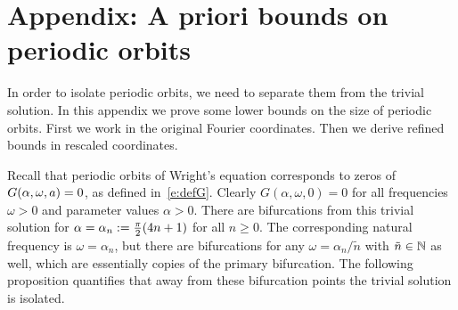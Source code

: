 

\section{Appendix: A priori bounds on periodic orbits}
\label{appendix:aprioribounds}

In order to isolate periodic orbits, we need to separate them from the trivial solution. In this appendix we prove some lower bounds on the size of periodic orbits. First we work in the original Fourier coordinates. Then we derive refined bounds in rescaled coordinates.

Recall that periodic orbits of Wright's equation corresponds to  zeros of 
$G(\alpha,\omega,a)=0$, as defined in~\eqref{e:defG}. Clearly $G(\alpha,\omega,0)=0$ for all frequencies $\omega>0$ and parameter values $\alpha>0$. There are bifurcations from this trivial solution for $\alpha=\alpha_n:=\tfrac{\pi}{2}(4n+1)$ for all $n\geq 0$. The corresponding natural frequency is $\omega=\alpha_n$, but there are bifurcations for any $\omega = \alpha_n/ \tilde{n}$ with $\tilde{n} \in \mathbb{N}$ as well, which are essentially copies of the primary bifurcation. The following proposition quantifies that away from these bifurcation points the trivial solution is isolated.
%
